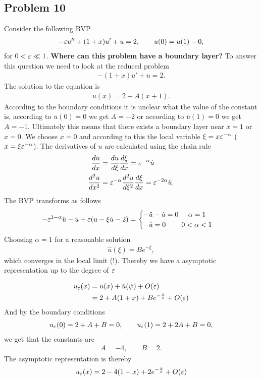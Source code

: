\subsection{Problem 10}
Consider the following BVP
\begin{align}
    -\varepsilon u'' + (1 + x)u' + u = 2, \qquad u(0) = u(1) - 0,
\end{align}
for $0 < \varepsilon \ll 1$. \textbf{Where can this problem have a boundary layer?}
To answer this question we need to look at the reduced problem
\begin{align}
    -(1+x)u' + u = 2.
\end{align}
The solution to the equation is
\begin{align}
    \bar{u}(x) = 2 + A(x+1).
\end{align}
According to the boundary conditions it is unclear what the value of the
constant is, according to $\bar{u}(0)=0$ we get $A = -2$ or according to
$\bar{u}(1)=0$ we get $A = -1$. Ultimately this means that there exists a
boundary layer near $x=1$ or $x=0$. We choose $x=0$ and according to this the
local variable $\xi = x\varepsilon^{-\alpha}$ ($x = \xi \varepsilon^{-\alpha}$). The
derivatives of $u$ are calculated using the chain rule
\begin{align}
    \frac{du}{dx}&= \frac{du}{d\xi}\frac{d\xi}{dx} = \varepsilon^{-\alpha} \dot{u}\\
    \frac{d^2u}{dx^2}&= \varepsilon^{-\alpha} \frac{d^2u}{d\xi^2}\frac{d\xi}{dx} =
    \varepsilon^{-2\alpha} \ddot{u}.
\end{align}
The BVP transforms as follows
\begin{align}
    -\varepsilon^{1-\alpha}\ddot{u} - \dot{u} + \varepsilon(u - \xi\dot{u} - 2) =
    \begin{cases}
        -\ddot{u} - \dot{u} = 0 \;\;\;\;\; \alpha=1\\
        -\dot{u} = 0 \;\;\;\;\;\;\;\; 0<\alpha<1
    \end{cases}
\end{align}
Choosing $\alpha = 1$ for a reasonable solution
\begin{align}
    \hat{u}(\xi) = Be^{-\xi},
\end{align}
which converges in the local limit (!). Thereby we have a asymptotic
representation up to the degree of $\varepsilon$

\begin{align}
    u_\varepsilon(x) &= \bar{u}(x) + \hat{u}(\psi) + O(\varepsilon)\\
              &= 2 + A(1+x) + B e^{-\frac{x}{\varepsilon}}  + O(\varepsilon)
\end{align}
And by the boundary conditions
\begin{align}
    u_\varepsilon(0) = 2+A+B=0, \qquad u_\varepsilon(1) = 2+2A+B=0,
\end{align}
we get that the constants are
\begin{align}
    A = -4, \qquad B = 2.
\end{align}
The asymptotic representation is thereby
\begin{align}
    u_\varepsilon(x) = 2 - 4(1+x) + 2 e^{-\frac{x}{\varepsilon}}  + O(\varepsilon)
\end{align}

